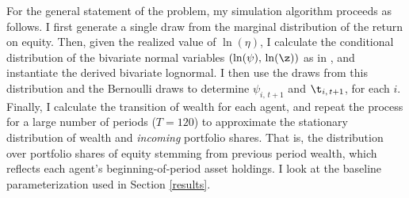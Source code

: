 For the general statement of the problem, my simulation algorithm proceeds as follows. I first generate a single draw from the marginal distribution of the return on equity. Then, given the realized value of $\ln(\eta)$, I calculate the conditional distribution of the bivariate normal variables $(\ln(\psi),\,\ln(\z))$ as in \citet[p.34]{Anderson2003}, and instantiate the derived bivariate lognormal. I then use the draws from this distribution and the Bernoulli draws to determine $\psi_{i,\,t+1}$ and $\t_{i,\,t+1}$, for each $i$. Finally, I calculate the transition of wealth for each agent, and repeat the process for a large number of periods ($T = 120$) to approximate the stationary distribution of wealth and \textit{incoming} portfolio shares. That is, the distribution over portfolio shares of equity stemming from previous period wealth, which reflects each agent's beginning-of-period asset holdings. I look at the baseline parameterization used in Section \ref{results}.

